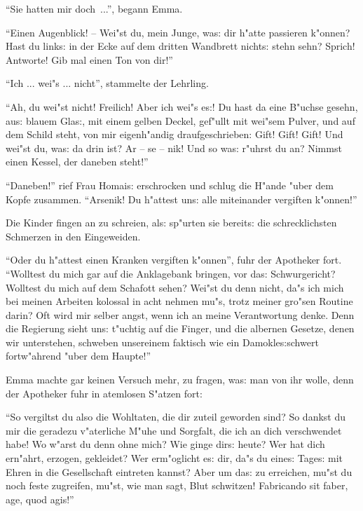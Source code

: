 \documentclass[oneside,12pt]{book}
\newenvironment{antiqua}{\normalfont}{}%
\newcommand{\s}{s:}%
\begin{document}
"`Sie hatten mir doch~..."', begann Emma.

"`Einen Augenblick! -- Wei"st du, mein Junge, wa{\s} dir h"atte
passieren k"onnen? Hast du link{\s} in der Ecke auf dem dritten
Wandbrett nicht{\s} stehn sehn? Sprich! Antworte! Gib mal einen
Ton von dir!"'

"`Ich ... wei"s ... nicht"', stammelte der Lehrling.

"`Ah, du wei"st nicht! Freilich! Aber ich wei"s e{\s}! Du hast da
eine B"uchse gesehn, au{\s} blauem Gla{\s}, mit einem gelben
Deckel, gef"ullt mit wei"sem Pulver, und auf dem Schild steht, von
mir eigenh"andig draufgeschrieben: {\glq}Gift! Gift! Gift!{\grq}
Und wei"st du, wa{\s} da drin ist? Ar -- se -- nik! Und so wa{\s}
r"uhrst du an? Nimmst einen Kessel, der daneben steht!"'

"`Daneben!"' rief Frau Homai{\s} erschrocken und schlug die H"ande
"uber dem Kopfe zusammen. "`Arsenik! Du h"attest un{\s} alle
miteinander vergiften k"onnen!"'

Die Kinder fingen an zu schreien, al{\s} sp"urten sie bereit{\s}
die schrecklichsten Schmerzen in den Eingeweiden.

"`Oder du h"attest einen Kranken vergiften k"onnen"', fuhr der
Apotheker fort. "`Wolltest du mich gar auf die Anklagebank
bringen, vor da{\s} Schwurgericht? Wolltest du mich auf dem
Schafott sehen? Wei"st du denn nicht, da"s ich mich bei meinen
Arbeiten kolossal in acht nehmen mu"s, trotz meiner gro"sen
Routine darin? Oft wird mir selber angst, wenn ich an meine
Verantwortung denke. Denn die Regierung sieht un{\s} t"uchtig auf
die Finger, und die albernen Gesetze, denen wir unterstehen,
schweben unsereinem faktisch wie ein Damokle{\s}schwert
fortw"ahrend "uber dem Haupte!"'

Emma machte gar keinen Versuch mehr, zu fragen, wa{\s} man von ihr
wolle, denn der Apotheker fuhr in atemlosen S"atzen fort:

"`So vergiltst du also die Wohltaten, die dir zuteil geworden
sind? So dankst du mir die geradezu v"aterliche M"uhe und
Sorgfalt, die ich an dich verschwendet habe! Wo w"arst du denn
ohne mich? Wie ginge dir{\s} heute? Wer hat dich ern"ahrt,
erzogen, gekleidet? Wer erm"oglicht e{\s} dir, da"s du eine{\s}
Tage{\s} mit Ehren in die Gesellschaft eintreten kannst? Aber um
da{\s} zu erreichen, mu"st du noch feste zugreifen, mu"st, wie man
sagt, Blut schwitzen! \begin{antiqua}Fabricando sit faber, age,
quod agis\end{antiqua}!"'
\end{document}
